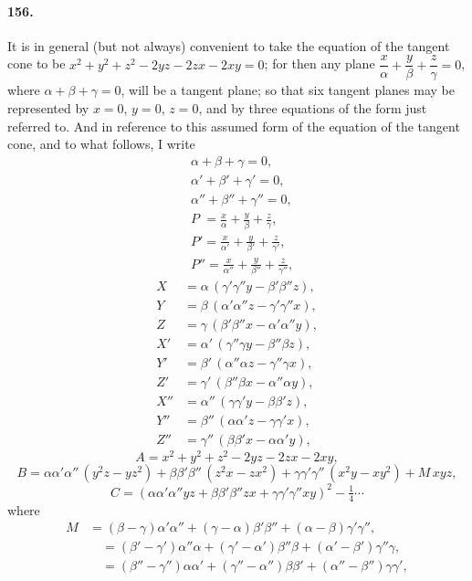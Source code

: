 \documentclass[11pt,a4paper]{article}
\begin{document}
\paragraph{156.}
It is in general (but not always) convenient to take the equation of the
tangent cone to be $x^2 + y^2 + z^2 - 2yz - 2zx - 2xy = 0$; for then any
plane $\dfrac{x}{\alpha} + \dfrac{y}{\beta} + \dfrac{z}{\gamma} = 0$,
where $\alpha + \beta + \gamma = 0$, will be a tangent plane; so that six
tangent planes may be represented by $x = 0$, $y = 0$, $z = 0$, and by
three equations of the form just referred to. And in reference to this
assumed form of the equation of the tangent cone, and to what follows,
I write
\[
\begin{aligned}
& \alpha + \beta + \gamma = 0, \\
& \alpha' + \beta' + \gamma' = 0, \\
& \alpha'' + \beta'' + \gamma'' = 0, \\
& P\phantom{'} = \tfrac{x}{\alpha} + \tfrac{y}{\beta} + \tfrac{z}{\gamma}, \\
& P' = \tfrac{x}{\alpha'} + \tfrac{y}{\beta'} + \tfrac{z}{\gamma'}, \\
& P'' = \tfrac{x}{\alpha''} + \tfrac{y}{\beta''} + \tfrac{z}{\gamma''},
\end{aligned}
\]
\[
\begin{aligned}
X &= \alpha\, (\gamma'\gamma'' y - \beta'\beta'' z), \\
Y &= \beta\, (\alpha'\alpha'' z - \gamma'\gamma'' x), \\
Z &= \gamma\, (\beta'\beta'' x - \alpha'\alpha'' y), \\
X' &= \alpha'\, (\gamma''\gamma y - \beta''\beta z), \\
Y' &= \beta'\, (\alpha''\alpha z - \gamma''\gamma x), \\
Z' &= \gamma'\, (\beta''\beta x - \alpha''\alpha y), \\
X'' &= \alpha''\, (\gamma\gamma' y - \beta\beta' z), \\
Y'' &= \beta''\, (\alpha\alpha' z - \gamma\gamma' x), \\
Z'' &= \gamma''\, (\beta\beta' x - \alpha\alpha' y),
\end{aligned}
\]
\[
A = x^2 + y^2 + z^2 - 2yz - 2zx - 2xy,
\]
\[
B = \alpha\alpha'\alpha''\,(y^2 z - y z^2) + \beta\beta'\beta''\,(z^2 x - z x^2)
+ \gamma\gamma'\gamma''\,(x^2 y - x y^2) + M\, xyz,
\]
\[
C = (\alpha\alpha'\alpha'' y z + \beta\beta'\beta'' z x + \gamma\gamma'\gamma'' x y)^2 - \tfrac{1}{4}\dotsb
\]
where
\[
\begin{aligned}
M &= (\beta - \gamma)\alpha'\alpha'' + (\gamma - \alpha)\beta'\beta''
+ (\alpha - \beta)\gamma'\gamma'', \\
&\quad = (\beta' - \gamma')\alpha''\alpha + (\gamma' - \alpha')\beta''\beta
+ (\alpha' - \beta')\gamma''\gamma, \\
&\quad = (\beta'' - \gamma'')\alpha\alpha' + (\gamma'' - \alpha'')\beta\beta'
+ (\alpha'' - \beta'')\gamma\gamma',
\end{aligned}
\]
\end{document}
